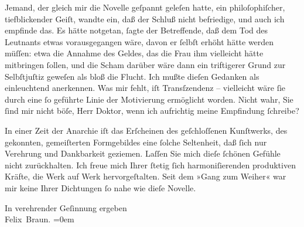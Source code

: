 \pstart
           Jemand, der gleich mir die
                  Novelle geſpannt geleſen
               hatte, ein philoſophiſcher, tiefblickender Geiſt, wandte ein, daß der Schluß nicht
               befriedige, und auch ich empfinde das. Es hätte notgetan, ſagte der Betreffende, daß dem Tod des
               Leutnants etwas vorausgegangen wäre, davon er ſelbſt erhöht hätte werden müſſen: etwa
               die Annahme des Geldes, das die Frau ihm vielleicht hätte mitbringen ſollen, und die
               Scham darüber wäre dann ein triftigerer Grund zur Selbſtjuſtiz geweſen als bloß die
               Flucht. Ich {\pb}mußte
               dieſen Gedanken als einleuchtend anerkennen. Was mir fehlt, iſt Transſzendenz –
               vielleicht wäre ſie durch eine ſo geführte Linie der Motivierung ermöglicht worden.
               Nicht wahr, Sie ſind mir nicht böſe, Herr Doktor, wenn ich aufrichtig meine
               Empfindung ſchreibe?\pend
           
\pstart
           In einer Zeit der Anarchie iſt das Erſcheinen des geſchloſſenen Kunſtwerks, des
               gekonnten, gemeiſterten Formgebildes eine ſolche Seltenheit, daß ſich nur Verehrung
               und Dankbarkeit geziemen. Laſſen Sie mich dieſe ſchönen Gefühle nicht zurückhalten.
               Ich freue mich Ihrer ſtetig ſich harmoni{\pb}ſierenden produktiven
               Kräfte, die Werk auf Werk hervorgeſtalten. Seit dem »Gang zum Weiher« war mir keine Ihrer Dichtungen ſo nahe wie dieſe Novelle.\pend
           
\pstart
           In verehrender Geſinnung ergeben{\\[\baselineskip]}\spacefill\mbox{Felix Braun.}\pend
           \leftskip=0em{}\endnumbering{}  
      